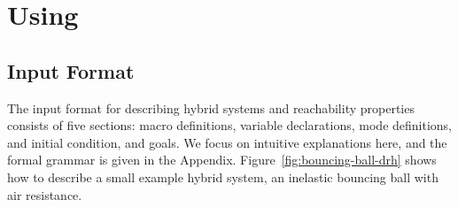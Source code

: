 \section{Using \dReach{}}\label{sec:using-dreach}
\subsection{Input Format}\label{sec:input-format}
The input format for describing hybrid systems and reachability properties consists of five
sections: macro definitions, variable declarations, mode definitions,
and initial condition, and goals. We focus on intuitive explanations here, and the formal grammar is
given in the Appendix. Figure~\ref{fig:bouncing-ball-drh} shows how to describe a small
example hybrid system, an inelastic bouncing ball with air resistance.

